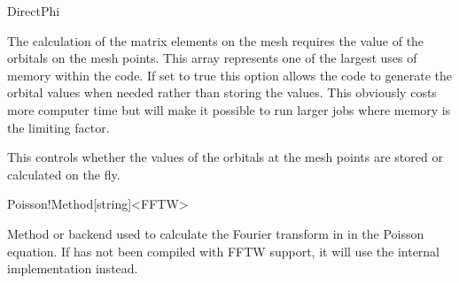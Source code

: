 \begin{fdflogicalF}{DirectPhi}

    The calculation of the matrix elements on the mesh requires the
    value of the orbitals on the mesh points. This array represents one
    of the largest uses of memory within the code. If set to true this
    option allows the code to generate the orbital values when needed
    rather than storing the values. This obviously costs more computer
    time but will make it possible to run larger jobs where memory is
    the limiting factor.

    This controls whether the values of the orbitals at the mesh points
    are stored or calculated on the fly.

\end{fdflogicalF}


\begin{fdfentry}{Poisson!Method}[string]<FFTW>

    Method or backend used to calculate the Fourier transform in \siesta
    in the Poisson equation. If \siesta has not been compiled with
    FFTW support, it will use the internal implementation instead.

\end{fdfentry}